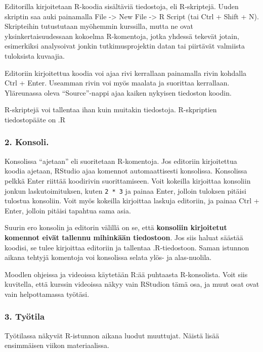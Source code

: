 \documentclass[
]{book}
\begin{document}
Editorilla kirjoitetaan R-koodia sisältäviä tiedostoja, eli R-skriptejä. Uuden skriptin saa auki painamalla File -\textgreater{} New File -\textgreater{} R Script (tai Ctrl + Shift + N). Skripteihin tutustutaan myöhemmin kurssilla, mutta ne ovat yksinkertaisuudessaan kokoelma R-komentoja, jotka yhdessä tekevät jotain, esimerkiksi analysoivat jonkin tutkimusprojektin datan tai piirtävät valmiista tuloksista kuvaajia.

Editoriin kirjoitettua koodia voi ajaa rivi kerrallaan painamalla rivin kohdalla Ctrl + Enter. Useamman rivin voi myös maalata ja suorittaa kerrallaan. Yläreunassa oleva ``Source''-nappi ajaa kaiken nykyisen tiedoston koodin.

R-skriptejä voi tallentaa ihan kuin muitakin tiedostoja. R-skpriptien tiedostopääte on .R

\hypertarget{konsoli.}{%
\subsubsection*{2. Konsoli.}\label{konsoli.}}

Konsolissa ``ajetaan'' eli suoritetaan R-komentoja. Jos editoriin kirjoitettua koodia ajetaan, RStudio ajaa komennot automaattisesti konsolissa. Konsolissa pelkkä Enter riittää koodirivin suorittamiseen. Voit kokeilla kirjoittaa konsoliin jonkun laskutoimituksen, kuten \texttt{2\ *\ 3} ja painaa Enter, jolloin tuloksen pitäisi tulostua konsoliin. Voit myös kokeilla kirjoittaa laskuja editoriin, ja painaa Ctrl + Enter, jolloin pitäisi tapahtua sama asia.

Suurin ero konsolin ja editorin välillä on se, että \textbf{konsoliin kirjoitetut komennot eivät tallennu mihinkään tiedostoon}. Jos siis haluat säästää koodisi, se tulee kirjoittaa editoriin ja tallentaa .R-tiedostoon. Saman istunnon aikana tehtyjä komentoja voi konsolissa selata ylös- ja alas-nuolila.

Moodlen ohjeissa ja videoissa käytetään R:ää puhtaasta R-konsolista. Voit siis kuvitella, että kurssin videoissa näkyy vain RStudion tämä osa, ja muut osat ovat vain helpottamassa työtäsi.

\hypertarget{tyuxf6tila}{%
\subsubsection*{3. Työtila}\label{tyuxf6tila}}

Työtilassa näkyvät R-istunnon aikana luodut muuttujat. Näistä lisää ensimmäisen viikon materiaalissa.
\end{document}
